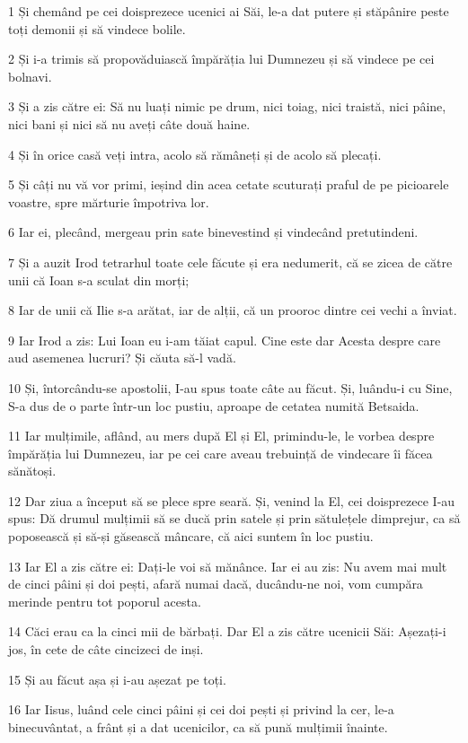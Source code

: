 \par 1 Și chemând pe cei doisprezece ucenici ai Săi, le-a dat putere și stăpânire peste toți demonii și să vindece bolile.
\par 2 Și i-a trimis să propovăduiască împărăția lui Dumnezeu și să vindece pe cei bolnavi.
\par 3 Și a zis către ei: Să nu luați nimic pe drum, nici toiag, nici traistă, nici pâine, nici bani și nici să nu aveți câte două haine.
\par 4 Și în orice casă veți intra, acolo să rămâneți și de acolo să plecați.
\par 5 Și câți nu vă vor primi, ieșind din acea cetate scuturați praful de pe picioarele voastre, spre mărturie împotriva lor.
\par 6 Iar ei, plecând, mergeau prin sate binevestind și vindecând pretutindeni.
\par 7 Și a auzit Irod tetrarhul toate cele făcute și era nedumerit, că se zicea de către unii că Ioan s-a sculat din morți;
\par 8 Iar de unii că Ilie s-a arătat, iar de alții, că un prooroc dintre cei vechi a înviat.
\par 9 Iar Irod a zis: Lui Ioan eu i-am tăiat capul. Cine este dar Acesta despre care aud asemenea lucruri? Și căuta să-l vadă.
\par 10 Și, întorcându-se apostolii, I-au spus toate câte au făcut. Și, luându-i cu Sine, S-a dus de o parte într-un loc pustiu, aproape de cetatea numită Betsaida.
\par 11 Iar mulțimile, aflând, au mers după El și El, primindu-le, le vorbea despre împărăția lui Dumnezeu, iar pe cei care aveau trebuință de vindecare îi făcea sănătoși.
\par 12 Dar ziua a început să se plece spre seară. Și, venind la El, cei doisprezece I-au spus: Dă drumul mulțimii să se ducă prin satele și prin sătulețele dimprejur, ca să poposească și să-și găsească mâncare, că aici suntem în loc pustiu.
\par 13 Iar El a zis către ei: Dați-le voi să mănânce. Iar ei au zis: Nu avem mai mult de cinci pâini și doi pești, afară numai dacă, ducându-ne noi, vom cumpăra merinde pentru tot poporul acesta.
\par 14 Căci erau ca la cinci mii de bărbați. Dar El a zis către ucenicii Săi: Așezați-i jos, în cete de câte cincizeci de inși.
\par 15 Și au făcut așa și i-au așezat pe toți.
\par 16 Iar Iisus, luând cele cinci pâini și cei doi pești și privind la cer, le-a binecuvântat, a frânt și a dat ucenicilor, ca să pună mulțimii înainte.
